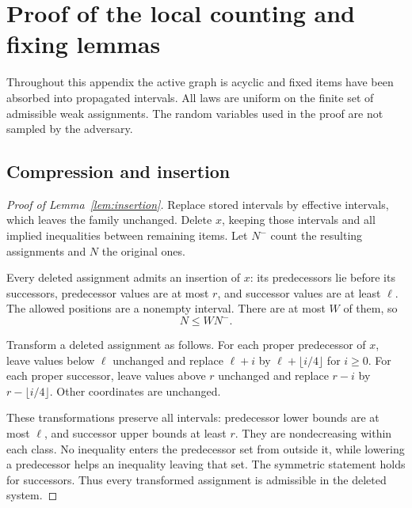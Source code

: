 \section{Proof of the local counting and fixing lemmas}
\label{app:local}

Throughout this appendix the active graph is acyclic and fixed items have
been absorbed into propagated intervals. All laws are uniform on the finite
set of admissible weak assignments. The random variables used in the proof
are not sampled by the adversary.

\subsection{Compression and insertion}

\begin{proof}[Proof of Lemma~\ref{lem:insertion}]
Replace stored intervals by effective intervals, which leaves the family
unchanged. Delete $x$, keeping those intervals and all implied inequalities
between remaining items. Let $N^-$ count the resulting assignments and $N$
the original ones.

Every deleted assignment admits an insertion of $x$: its predecessors lie
before its successors, predecessor values are at most $r$, and successor
values are at least $\ell$. The allowed positions are a nonempty interval.
There are at most $W$ of them, so
\begin{equation}
                              N\leq WN^-.
\label{eq:delete-upper}
\end{equation}

Transform a deleted assignment as follows. For each proper predecessor of
$x$, leave values below $\ell$ unchanged and replace
$\ell+i$ by $\ell+\lfloor i/4\rfloor$ for $i\geq0$.
For each proper successor, leave values above $r$ unchanged and replace
$r-i$ by $r-\lfloor i/4\rfloor$.
Other coordinates are unchanged.

These transformations preserve all intervals: predecessor lower bounds are
at most $\ell$, and successor upper bounds at least $r$.
They are nondecreasing within each class. No inequality enters the
predecessor set from outside it, while lowering a predecessor helps an
inequality leaving that set. The symmetric statement holds for successors.
Thus every transformed assignment is admissible in the deleted system.


\end{proof}

